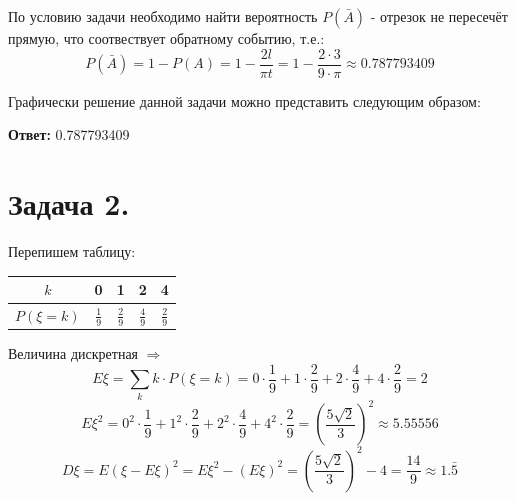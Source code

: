 По условию задачи необходимо найти вероятность $P(\bar A)$ - отрезок не пересечёт прямую, что соотвествует обратному событию, т.е.:
\[
P(\bar A) = 1 - P(A) = 1 - \frac{2l}{\pi t} = 1 - \frac{2 \cdot 3}{9 \cdot \pi} \approx 0.787793409
\]

Графически решение данной задачи можно представить следующим образом:
\begin{figure}[H]
\end{figure}

\noindent\textbf{Ответ:} 0.787793409

\section*{Задача 2.}

Перепишем таблицу:
\begin{table}[H]
	\centering\makegapedcells
	\begin{tabular}{|c|c|c|c|c|}
		\hline
		$k$        & 0             & 1             & 2             & 4             \\ \hline
		$P(\xi=k)$ & $\frac{1}{9}$ & $\frac{2}{9}$ & $\frac{4}{9}$ & $\frac{2}{9}$ \\ \hline
	\end{tabular}
\end{table}
Величина дискретная $\Rightarrow$
\[
E\xi = \sum_{k} k \cdot P(\xi = k) = 0 \cdot \frac{1}{9} + 1 \cdot \frac{2}{9} + 2 \cdot \frac{4}{9} + 4 \cdot \frac{2}{9} = 2
\]
\[
E\xi^2 = 0^2 \cdot \frac{1}{9} + 1^2 \cdot \frac{2}{9} + 2^2 \cdot \frac{4}{9} + 4^2 \cdot \frac{2}{9} = \left(\frac{5 \sqrt{2}}{3}\right)^2 \approx 5.55556
\]
\[
D\xi = E(\xi - E\xi)^2 = E\xi^2 - (E\xi)^2 = \left(\frac{5 \sqrt{2}}{3}\right)^2 - 4 = \frac{14}{9} \approx 1.\bar{5}
\]

